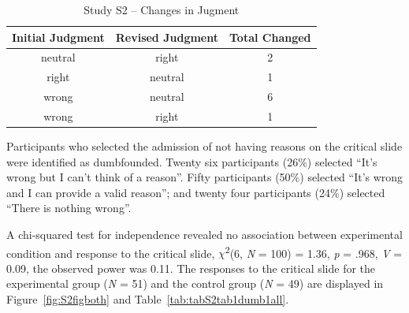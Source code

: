 \documentclass[
  american,
  man,floatsintext]{apa7}
\begin{document}
\begin{table}[tbp]

\begin{center}
\begin{threeparttable}

\caption{\label{tab:tabS2change}Study S2 – Changes in Jugment}

\begin{tabular}{ccc}
\toprule
Initial Judgment & \multicolumn{1}{c}{Revised Judgment} & \multicolumn{1}{c}{Total Changed}\\
\midrule
neutral & right & 2\\
right & neutral & 1\\
wrong & neutral & 6\\
wrong & right & 1\\
\bottomrule
\end{tabular}

\end{threeparttable}
\end{center}

\end{table}

Participants who selected the admission of not having reasons on the critical slide were identified as dumbfounded. Twenty six participants (26\%) selected \enquote{It's wrong but I can't think of a reason}. Fifty participants (50\%) selected \enquote{It's wrong and I can provide a valid reason}; and twenty four participants (24\%) selected \enquote{There is nothing wrong}.

A chi-squared test for independence revealed no association between experimental condition and response to the critical slide, \(\chi\)\textsuperscript{2}(6, \emph{N} = 100) = 1.36, \emph{p} = .968, \emph{V} = 0.09, the observed power was 0.11. The responses to the critical slide for the experimental group (\emph{N} = 51) and the control group (\emph{N} = 49) are displayed in Figure~\ref{fig:S2figboth} and Table~\ref{tab:tabS2tab1dumb1all}.
\end{document}
